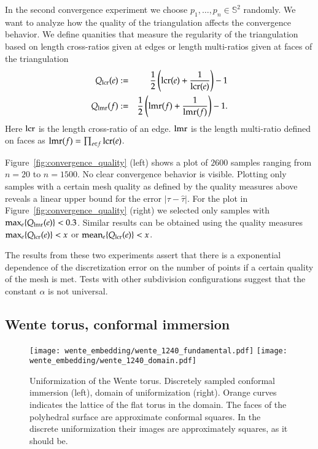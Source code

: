 \documentclass[Thesis.tex]{subfiles}
\begin{document}
  In the second convergence experiment we choose $p_1,\ldots,p_n\in \mathbb S^2$ randomly. We want to analyze how the quality of the triangulation affects the convergence behavior. We define quanities that measure the regularity of the triangulation based on length cross-ratios given at edges or length multi-ratios given at faces of the triangulation
  \begin{eqnarray*}
  	Q_{\operatorname{lcr}}(e) &:=& \frac{1}{2}\left(\operatorname{lcr}(e) + \frac{1}{\operatorname{lcr}(e)}\right) - 1\label{eq:quality_lcr}\\
  	Q_{\operatorname{lmr}}(f) &:=& \frac{1}{2}\left(\operatorname{lmr}(f) + \frac{1}{\operatorname{lmr}(f)}\right) - 1\label{eq:quality_lmr}.
  \end{eqnarray*}
  Here $\operatorname{lcr}$ is the length cross-ratio of an edge. $\operatorname{lmr}$ is the length multi-ratio defined on faces as $\operatorname{lmr}(f)=\prod_{e \in f}\operatorname{lcr}(e)$.

  Figure~\ref{fig:convergence_quality} (left) shows a plot of $2600$ samples ranging from $n=20$ to $n=1500$. No clear convergence behavior is visible. Plotting only samples with a certain mesh quality as defined by the quality measures above reveals a linear upper bound for the error $|\tau-\hat \tau|$. For the plot in Figure~\ref{fig:convergence_quality} (right) we selected only samples with $\max_e \{Q_{\operatorname{lmr}}(e)\} < 0.3$. Similar results can be obtained using the quality measures $\max_e \{Q_{\operatorname{lcr}}(e)\} < x$ or $\operatorname{mean}_e \{Q_{\operatorname{lcr}}(e)\} < x$.

  The results from these two experiments assert that there is a exponential dependence of the discretization error on the number of points if a certain quality of the mesh is met. Tests with other subdivision configurations suggest that the constant $\alpha$ is not universal.

  \subsection{Wente torus, conformal immersion}

  \begin{figure}
      \centering
      \texttt{[image: wente\_embedding/wente\_1240\_fundamental.pdf]}\hfill
      \texttt{[image: wente\_embedding/wente\_1240\_domain.pdf]}
      \caption{Uniformization of the Wente torus. Discretely sampled conformal immersion (left), domain of uniformization (right). Orange curves indicates the lattice of the flat torus in the domain. The faces of the polyhedral surface are approximate conformal squares. In the discrete uniformization their images are approximately squares, as it should be.}
  \end{figure}
\end{document}
